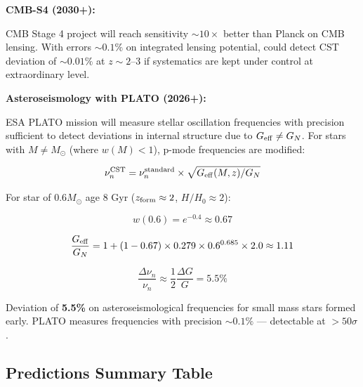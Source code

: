 \documentclass[11pt,a4paper]{article}
\begin{document}
\textbf{CMB-S4 (2030+):}

CMB Stage 4 project will reach sensitivity \(\sim 10\times\) better than
Planck on CMB lensing. With errors \(\sim 0.1\%\) on integrated lensing
potential, could detect CST deviation of \(\sim 0.01\%\) at
\(z \sim 2\)--3 if systematics are kept under control at extraordinary
level.

\textbf{Asteroseismology with PLATO (2026+):}

ESA PLATO mission will measure stellar oscillation frequencies with
precision sufficient to detect deviations in internal structure due to
\(G_{\rm eff} \neq G_N\). For stars with \(M \neq M_\odot\) (where
\(w(M) < 1\)), p-mode frequencies are modified:

\[\nu_n^{\rm CST} = \nu_n^{\rm standard} \times \sqrt{G_{\rm eff}(M,z)/G_N}\]

For star of \(0.6 M_\odot\) age 8 Gyr (\(z_{\rm form} \approx 2\),
\(H/H_0 \approx 2\)):

\[w(0.6) = e^{-0.4} \approx 0.67\]

\[\frac{G_{\rm eff}}{G_N} = 1 + (1-0.67) \times 0.279 \times 0.6^{0.685} \times 2.0 \approx 1.11\]

\[\frac{\Delta\nu_n}{\nu_n} \approx \frac{1}{2}\frac{\Delta G}{G} = 5.5\%\]

Deviation of \textbf{5.5\%} on asteroseismological frequencies for small
mass stars formed early. PLATO measures frequencies with precision
\(\sim 0.1\%\) --- detectable at \(> 50\sigma\).

\hypertarget{predictions-summary-table}{%
\subsection{Predictions Summary
Table}\label{predictions-summary-table}}
\end{document}
